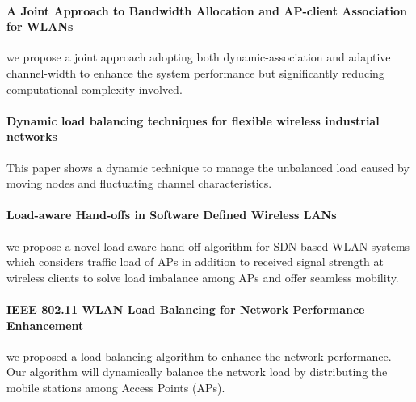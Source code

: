 \documentclass[journal,transmag]{IEEEtran}
\begin{document}
\paragraph{A Joint Approach to Bandwidth Allocation and AP-client Association for WLANs \cite{10joint_bandwidth_association}}
we propose a joint approach adopting both dynamic-association and adaptive channel-width to enhance the system performance but significantly reducing computational complexity involved.


\paragraph{Dynamic load balancing techniques for flexible wireless industrial networks \cite{10dynamic_load_balancing_industrial}}
This paper shows a dynamic technique to manage the unbalanced load caused by moving nodes and fluctuating channel characteristics.


\paragraph{Load-aware Hand-offs in Software Defined Wireless LANs \cite{14load_handoff_SDN}}
we propose a novel load-aware hand-off algorithm for SDN based WLAN systems which considers traffic load of APs in addition to received signal strength at wireless clients to solve load imbalance among APs and offer seamless mobility.


\paragraph{IEEE 802.11 WLAN Load Balancing for Network Performance Enhancement \cite{15load_performance_enhancement}}
we proposed a load balancing algorithm to enhance the network performance. Our algorithm will dynamically balance the network load by distributing the mobile stations among Access Points (APs).
\end{document}
